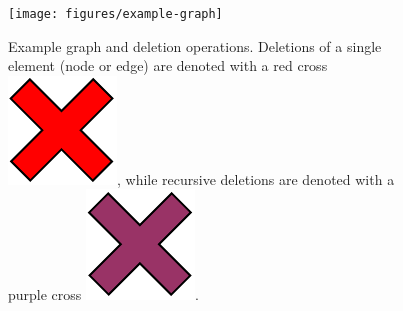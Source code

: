 \begin{figure}[ht]
    \centering
    \texttt{[image: figures/example-graph]}
    \caption{Example graph and deletion operations. Deletions of a single element (node or edge) are denoted with a red cross \includegraphics[scale=0.14]{patterns/delete-single}, while recursive deletions are denoted with a purple cross \includegraphics[scale=0.14]{patterns/delete-recursively}.}
    \label{fig:example-graph}
\end{figure}
